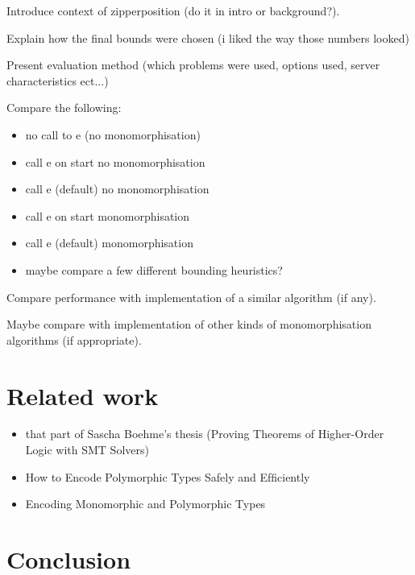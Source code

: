 \documentclass{article}
\begin{document}
Introduce context of zipperposition (do it in intro or background?).

Explain how the final bounds were chosen (i liked the way those numbers looked)

Present evaluation method (which problems were used, options used, server characteristics ect...)

Compare the following:
    \begin{itemize}
        \item no call to e (no monomorphisation)
        \item call e on start no monomorphisation
        \item call e (default) no monomorphisation
        \item call e on start monomorphisation
        \item call e (default) monomorphisation
        \item maybe compare a few different bounding heuristics?
    \end{itemize}

Compare performance with implementation of a similar algorithm (if any).

Maybe compare with implementation of other kinds of monomorphisation algorithms (if appropriate).

\section{Related work}

\begin{itemize}
    \item that part of Sascha Boehme's thesis (Proving Theorems of Higher-Order Logic with SMT Solvers)
    \item How to Encode Polymorphic Types Safely and Efﬁciently
    \item Encoding Monomorphic and Polymorphic Types
\end{itemize}

\section{Conclusion}
\end{document}

